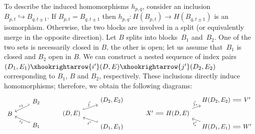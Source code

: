 \documentclass[letterpaper,11pt]{article}
\theoremstyle{plain}
\theoremstyle{definition}
\newcounter{li}
\newcommand{\idxmap}[1]{\iota_{#1}}
\newcommand\michal[1]{\textcolor{ForestGreen}{[ML: #1]}}
\newcommand{\bl}{B}
\begin{document}
To describe the induced homomorphisms $h_{p,q}$, consider
an inclusion
$B_{p,t}\hookrightarrow B_{q,t\pm 1}$. 
If $B_{p,t}=B_{q,t\pm 1}$ then $h_{p,q}:H(B_{p,t})\rightarrow H(B_{q,t\pm 1})$ is an isomorphism.
Otherwise, the two blocks are involved in a split (or equivalently merge in the opposite direction).
Let $\bl$ splits into blocks~$\bl_1$ and~$\bl_2$. 
One of the two sets is necessarily closed in $\bl$, the other is open; let us assume that~$\bl_1$ is closed and $\bl_2$ open in $\bl$.
We can construct a nested sequence of index pairs $(D_1,E_1)\xhookrightarrow{i'}(D,E)\xhookrightarrow{j'}(D_2,E_2)$ corresponding to $\bl_1$, $\bl$ and $\bl_2$, respectively.
These inclusions directly induce homomorphisms; therefore, we obtain the following diagrams:
\begin{equation}\label{eq:ar-split-inclusions}
    \begin{tikzcd}[row sep=tiny, column sep=normal]
        & \bl_2\\
        \bl  
            \arrow[ru, "\idxmap{2}", hookleftarrow, sloped]
            \arrow[rd, "\idxmap{1}", hookleftarrow, sloped, swap]& \\
        & \bl_1 
    \end{tikzcd}
    \hspace{1cm}
    \begin{tikzcd}[row sep=tiny, column sep=normal]
        & (D_2,E_2)\\
        (D,E)
            \arrow[ru, "j'", hookrightarrow, sloped]
            \arrow[rd, "i'", hookleftarrow, sloped, swap]& \\
        & (D_1,E_1)
    \end{tikzcd}
    \hspace{1cm}
    \begin{tikzcd}[row sep=tiny, column sep=small]
        & & H(D_2,E_2) \ar[r,equal] & V'\\
        X' \ar[r,equal] & H(D,E) \arrow[ru, "j_\ast'",sloped] & \\
        & & H(D_1,E_1)\arrow[lu, "i_\ast'",swap, sloped] \ar[r,equal]& W'
    \end{tikzcd}
\end{equation}
\end{document}
